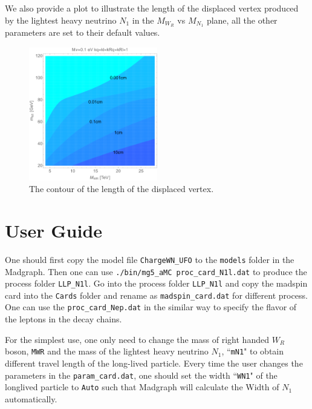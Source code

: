 \documentclass[12pt]{article}
\begin{document}
\vspace{5mm}

We also provide a plot to illustrate the length of the displaced vertex produced by the lightest heavy neutrino $N_1$ in the $M_{W_R}$ vs $M_{N_1}$ plane, all the other parameters are set to their default values.
\begin{figure}[h!]
 \centering
 \includegraphics[width=0.5\textwidth]{decaylength.pdf}
 \caption{The contour of the length of the displaced vertex.}
 \end{figure}

\section{User Guide}
One should first copy the model file \texttt{ChargeWN\_UFO} to the \texttt{models} folder in the Madgraph. Then one can use \texttt{./bin/mg5\_aMC proc\_card\_N1l.dat} to produce the process folder \texttt{LLP\_N1l}. Go into the process folder \texttt{LLP\_N1l} and copy the madspin card into the \texttt{Cards} folder and rename as \texttt{madspin\_card.dat} for different process. One can use the \texttt{proc\_card\_Nep.dat} in the similar way to specify the flavor of the leptons in the decay chains. 

For the simplest use, one only need to change the mass of right handed $W_R$ boson, \texttt{MWR} and the mass of the lightest heavy neutrino $N_1$, ``\texttt{mN1}" to obtain different travel length of the long-lived particle. Every time the user changes the parameters in the \texttt{param\_card.dat}, one should set the width ``\texttt{WN1}" of the longlived particle to \texttt{Auto} such that Madgraph will calculate the Width of $N_1$ automatically.
\end{document}
